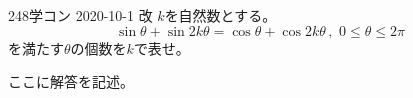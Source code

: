 \begin{prob}{248}{}{学コン 2020-10-1 改}
 $k$を自然数とする。
 \[ \sin\theta+\sin 2k\theta=\cos\theta+\cos 2k\theta \,,\,\, 0\le\theta\le 2\pi \]
 を満たす$\theta$の個数を$k$で表せ。
\end{prob}
ここに解答を記述。